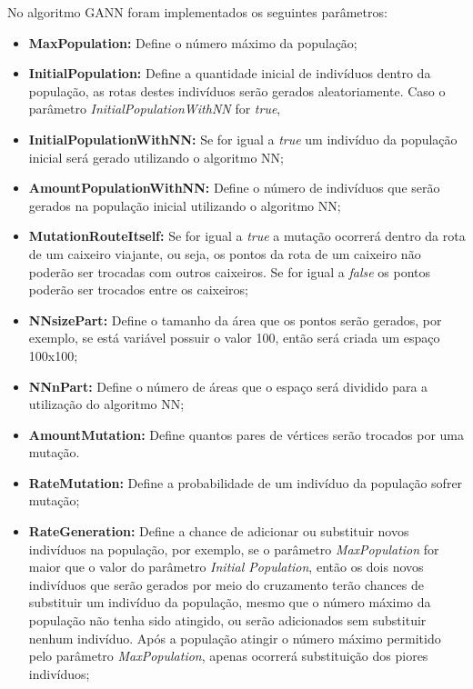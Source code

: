 \documentclass[12pt,openright,a4paper,oneside]{tcc}
\begin{document}
        No algoritmo GANN foram implementados os seguintes parâmetros:
         
            \begin{itemize}
                \item \textbf{MaxPopulation:} Define o número máximo da população; 
                \item \textbf{InitialPopulation:} Define a quantidade inicial de indivíduos dentro da população, as rotas destes indivíduos serão gerados aleatoriamente. Caso o parâmetro \textit{InitialPopulationWithNN} for \textit{true}, 
                \item \textbf{InitialPopulationWithNN:} Se for igual a \textit{true} um indivíduo da população inicial será gerado utilizando o algoritmo NN;
                \item \textbf{AmountPopulationWithNN:} Define o número de indivíduos que serão gerados na população inicial utilizando o algoritmo NN;
                \item \textbf{MutationRouteItself:} Se for igual a \textit{true} a mutação ocorrerá dentro da rota de um caixeiro viajante, ou seja, os pontos da rota de um caixeiro não poderão ser trocadas com outros caixeiros. Se for igual a \textit{false} os pontos poderão ser trocados entre os caixeiros;
                \item \textbf{NNsizePart:} Define o tamanho da área que os pontos serão gerados, por exemplo, se está variável possuir o valor 100, então será criada um espaço 100x100;
                \item \textbf{NNnPart:} Define o número de áreas que o espaço será dividido para a utilização do algoritmo NN;
                \item \textbf{AmountMutation:} Define quantos pares de vértices serão trocados por uma mutação.
                \item \textbf{RateMutation:} Define a probabilidade de um indivíduo da população sofrer mutação;
                \item \textbf{RateGeneration:} Define a chance de adicionar ou substituir novos indivíduos na população, por exemplo, se o parâmetro \textit{MaxPopulation} for maior que o valor do parâmetro \textit{Initial Population}, então os dois novos indivíduos que serão gerados por meio do cruzamento terão chances de substituir um indivíduo da população, mesmo que o número máximo da população não tenha sido atingido, ou serão adicionados sem substituir nenhum indivíduo. Após a população atingir o número máximo permitido pelo parâmetro \textit{MaxPopulation}, apenas ocorrerá substituição dos piores indivíduos;

\end{itemize}
\end{document}
